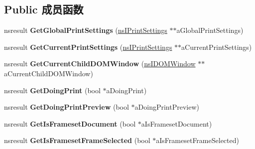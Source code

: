 \subsection*{Public 成员函数}
\begin{DoxyCompactItemize}
\item 
\mbox{\label{interfacens_i_web_browser_print_a8d921f9fd3a22a3fd79576cf10a88950}} 
nsresult {\bfseries Get\+Global\+Print\+Settings} (\hyperlink{interfacens_i_print_settings}{ns\+I\+Print\+Settings} $\ast$$\ast$a\+Global\+Print\+Settings)
\item 
\mbox{\label{interfacens_i_web_browser_print_ac9b904517ade51af4bc95a99e8b3cb24}} 
nsresult {\bfseries Get\+Current\+Print\+Settings} (\hyperlink{interfacens_i_print_settings}{ns\+I\+Print\+Settings} $\ast$$\ast$a\+Current\+Print\+Settings)
\item 
\mbox{\label{interfacens_i_web_browser_print_a74e93c466f5e6f3b3aee52973755a70c}} 
nsresult {\bfseries Get\+Current\+Child\+D\+O\+M\+Window} (\hyperlink{interfacens_i_d_o_m_window}{ns\+I\+D\+O\+M\+Window} $\ast$$\ast$a\+Current\+Child\+D\+O\+M\+Window)
\item 
\mbox{\label{interfacens_i_web_browser_print_adc0c1d45e6940027b72db58e024d57e8}} 
nsresult {\bfseries Get\+Doing\+Print} (bool $\ast$a\+Doing\+Print)
\item 
\mbox{\label{interfacens_i_web_browser_print_aa24d6488869d412125f4123ba26b1486}} 
nsresult {\bfseries Get\+Doing\+Print\+Preview} (bool $\ast$a\+Doing\+Print\+Preview)
\item 
\mbox{\label{interfacens_i_web_browser_print_a302bd07b6b1924829077f265fee4e840}} 
nsresult {\bfseries Get\+Is\+Frameset\+Document} (bool $\ast$a\+Is\+Frameset\+Document)
\item 
\mbox{\label{interfacens_i_web_browser_print_ae65ada9e1a3eaeef4af334ff043dbfe1}} 
nsresult {\bfseries Get\+Is\+Frameset\+Frame\+Selected} (bool $\ast$a\+Is\+Frameset\+Frame\+Selected)
\item 
\mbox{\label{interfacens_i_web_browser_print_aeb4e63cf104b7526a800b76798a6ea62}} 
$$
\end{DoxyCompactItemize}

